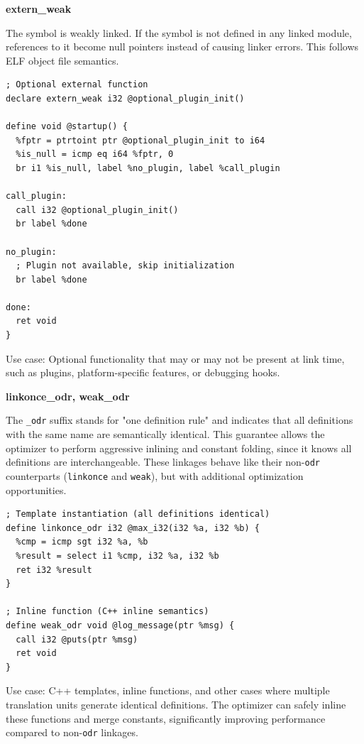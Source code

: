 \textbf{extern\_weak}

The symbol is weakly linked. If the symbol is not defined in any linked module, references to it become null pointers instead of causing linker errors. This follows ELF object file semantics.

\begin{lstlisting}[style=ir]
; Optional external function
declare extern_weak i32 @optional_plugin_init()

define void @startup() {
  %fptr = ptrtoint ptr @optional_plugin_init to i64
  %is_null = icmp eq i64 %fptr, 0
  br i1 %is_null, label %no_plugin, label %call_plugin

call_plugin:
  call i32 @optional_plugin_init()
  br label %done

no_plugin:
  ; Plugin not available, skip initialization
  br label %done

done:
  ret void
}
\end{lstlisting}

Use case: Optional functionality that may or may not be present at link time, such as plugins, platform-specific features, or debugging hooks.

\textbf{linkonce\_odr, weak\_odr}

The \texttt{\_odr} suffix stands for "one definition rule" and indicates that all definitions with the same name are semantically identical.
This guarantee allows the optimizer to perform aggressive inlining and constant folding, since it knows all definitions are interchangeable.
These linkages behave like their non-\texttt{odr} counterparts (\texttt{linkonce} and \texttt{weak}), but with additional optimization opportunities.

\begin{lstlisting}[style=ir]
; Template instantiation (all definitions identical)
define linkonce_odr i32 @max_i32(i32 %a, i32 %b) {
  %cmp = icmp sgt i32 %a, %b
  %result = select i1 %cmp, i32 %a, i32 %b
  ret i32 %result
}

; Inline function (C++ inline semantics)
define weak_odr void @log_message(ptr %msg) {
  call i32 @puts(ptr %msg)
  ret void
}
\end{lstlisting}

Use case: C++ templates, inline functions, and other cases where multiple translation units generate identical definitions. The optimizer can safely inline these functions and merge constants, significantly improving performance compared to non-\texttt{odr} linkages.

